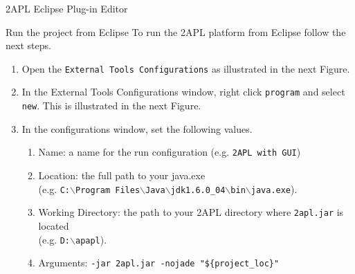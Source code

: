 \begin{section}{2APL Eclipse Plug-in Editor}
\begin{section}{Run the project from Eclipse}
    To run the 2APL platform from Eclipse follow the next steps.
    \begin{enumerate}
    \item Open the \texttt{External Tools Configurations} as
    illustrated in the next Figure.
        \begin{figure}[ht]
            \begin{center}
            \end{center}
            \label{fig:runconfiguration}
        \end{figure}

    \item In the External Tools Configurations window, right click \texttt{program} and select
    \texttt{new}. This is illustrated in the next Figure.
        \begin{figure}[ht]
            \begin{center}
            \end{center}\label{fig:runconfiguration1}
        \end{figure}

    \item In the configurations window, set the following values.
        \begin{enumerate}
        \item Name: a name for the run configuration (e.g. \texttt{2APL with GUI})

        \item Location: the full path to your java.exe\\
        (e.g. \texttt{C:$\backslash$Program
        Files$\backslash$Java$\backslash$jdk1.6.0\_04$\backslash$bin$\backslash$java.exe}).

        \item Working Directory: the path to your 2APL directory where {\tt 2apl.jar} is
        located\\
        (e.g. \texttt{D:$\backslash$apapl}).

        \item Arguments: \texttt{-jar 2apl.jar -nojade "\$\{project\_loc\}"}
        \end{enumerate}


\end{enumerate}
\end{section}
\end{section}
